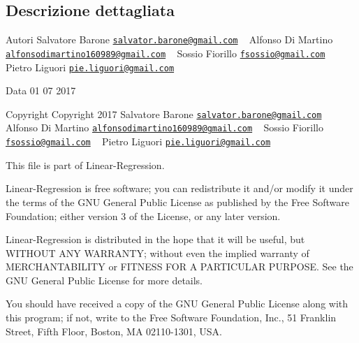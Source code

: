 \subsection{Descrizione dettagliata}
\begin{DoxyAuthor}{Autori}
Salvatore Barone \href{mailto:salvator.barone@gmail.com}{\tt salvator.\+barone@gmail.\+com} ~\newline
 Alfonso Di Martino \href{mailto:alfonsodimartino160989@gmail.com}{\tt alfonsodimartino160989@gmail.\+com} ~\newline
 Sossio Fiorillo \href{mailto:fsossio@gmail.com}{\tt fsossio@gmail.\+com} ~\newline
 Pietro Liguori \href{mailto:pie.liguori@gmail.com}{\tt pie.\+liguori@gmail.\+com} ~\newline

\end{DoxyAuthor}
\begin{DoxyDate}{Data}
01 07 2017
\end{DoxyDate}
\begin{DoxyCopyright}{Copyright}
Copyright 2017 Salvatore Barone \href{mailto:salvator.barone@gmail.com}{\tt salvator.\+barone@gmail.\+com} ~\newline
 Alfonso Di Martino \href{mailto:alfonsodimartino160989@gmail.com}{\tt alfonsodimartino160989@gmail.\+com} ~\newline
 Sossio Fiorillo \href{mailto:fsossio@gmail.com}{\tt fsossio@gmail.\+com} ~\newline
 Pietro Liguori \href{mailto:pie.liguori@gmail.com}{\tt pie.\+liguori@gmail.\+com} ~\newline

\end{DoxyCopyright}
This file is part of Linear-\/\+Regression.

Linear-\/\+Regression is free software; you can redistribute it and/or modify it under the terms of the G\+NU General Public License as published by the Free Software Foundation; either version 3 of the License, or any later version.

Linear-\/\+Regression is distributed in the hope that it will be useful, but W\+I\+T\+H\+O\+UT A\+NY W\+A\+R\+R\+A\+N\+TY; without even the implied warranty of M\+E\+R\+C\+H\+A\+N\+T\+A\+B\+I\+L\+I\+TY or F\+I\+T\+N\+E\+SS F\+OR A P\+A\+R\+T\+I\+C\+U\+L\+AR P\+U\+R\+P\+O\+SE. See the G\+NU General Public License for more details.

You should have received a copy of the G\+NU General Public License along with this program; if not, write to the Free Software Foundation, Inc., 51 Franklin Street, Fifth Floor, Boston, MA 02110-\/1301, U\+SA. 